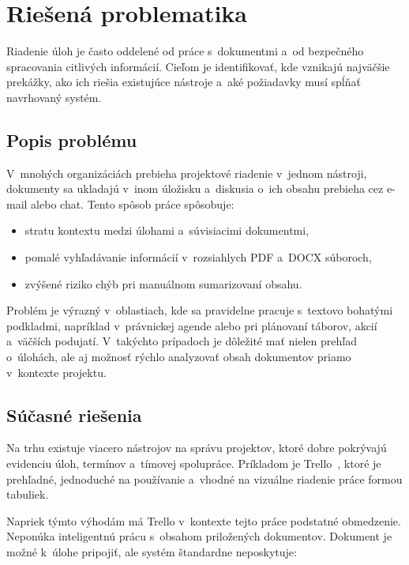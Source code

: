 \chapter{Riešená problematika}

Riadenie úloh je často oddelené od práce s~dokumentmi a~od bezpečného spracovania
citlivých informácií. Cieľom je identifikovať, kde vznikajú najväčšie prekážky, ako
ich riešia existujúce nástroje a~aké požiadavky musí spĺňať navrhovaný systém.

\section{Popis problému}

        V~mnohých organizáciách prebieha projektové riadenie v~jednom nástroji, dokumenty
sa ukladajú v~inom úložisku a~diskusia o~ich obsahu prebieha cez e-mail alebo chat.
Tento spôsob práce spôsobuje:

\begin{itemize}
  \item stratu kontextu medzi úlohami a~súvisiacimi dokumentmi,
  \item pomalé vyhľadávanie informácií v~rozsiahlych PDF a~DOCX súboroch,
  \item zvýšené riziko chýb pri manuálnom sumarizovaní obsahu.
\end{itemize}

        Problém je výrazný v~oblastiach, kde sa pravidelne pracuje s~textovo bohatými
podkladmi, napríklad v~právnickej agende alebo pri plánovaní táborov, akcií a~väčších
podujatí. V~takýchto prípadoch je dôležité mať nielen prehľad o~úlohách, ale aj možnosť
rýchlo analyzovať obsah dokumentov priamo v~kontexte projektu.

\section{Súčasné riešenia}

        Na trhu existuje viacero nástrojov na správu projektov, ktoré dobre pokrývajú
evidenciu úloh, termínov a~tímovej spolupráce. Príkladom je Trello~\cite{trello_com}, ktoré je prehľadné,
jednoduché na používanie a~vhodné na vizuálne riadenie práce formou tabuliek.

        Napriek týmto výhodám má Trello v~kontexte tejto práce podstatné obmedzenie.
Neponúka inteligentnú prácu s~obsahom priložených dokumentov. Dokument je možné k~úlohe
pripojiť, ale systém štandardne neposkytuje:

